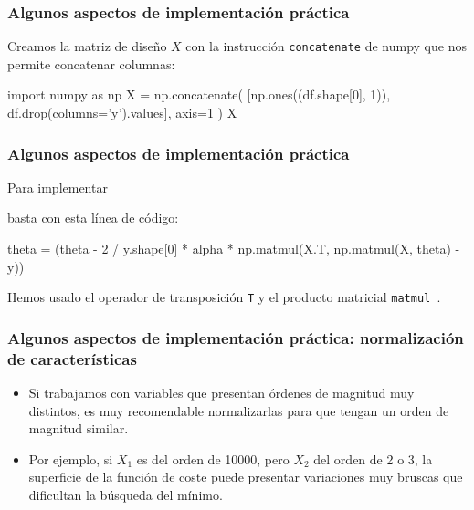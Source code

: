 \documentclass[aspectratio=169]{beamer}
\begin{document}
\begin{frame}[fragile]
\frametitle{Algunos aspectos de implementación práctica}
Creamos la matriz de diseño $X$ con la instrucción {\tt concatenate} de numpy que nos permite concatenar columnas: 

\begin{pyconsole}
import numpy as np
X = np.concatenate(
          [np.ones((df.shape[0], 1)), df.drop(columns='y').values],
          axis=1
)
X
\end{pyconsole}


\end{frame}

\begin{frame}[fragile]
\frametitle{Algunos aspectos de implementación práctica}
Para implementar    \begin{center}
\end{center}
basta con esta línea de código:


\begin{pyverbatim}
theta = (theta - 2 / y.shape[0] 
  * alpha * np.matmul(X.T, np.matmul(X, theta) - y))
  \end{pyverbatim}
Hemos usado el operador de transposición {\tt T} y el producto
matricial {\tt matmul }.


\end{frame}


\begin{frame}\frametitle{Algunos aspectos de implementación práctica: normalización de características}
\begin{itemize}
\item Si trabajamos con variables que presentan órdenes de magnitud muy distintos, es muy recomendable normalizarlas para que tengan un orden de magnitud similar.

\item Por ejemplo, si $X_1$ es del orden de 10000, pero $X_2$ del orden de 2 o 3, la superficie de la función de coste puede presentar variaciones muy bruscas que dificultan la búsqueda del mínimo. 
\end{itemize}
\end{frame}
\end{document}
